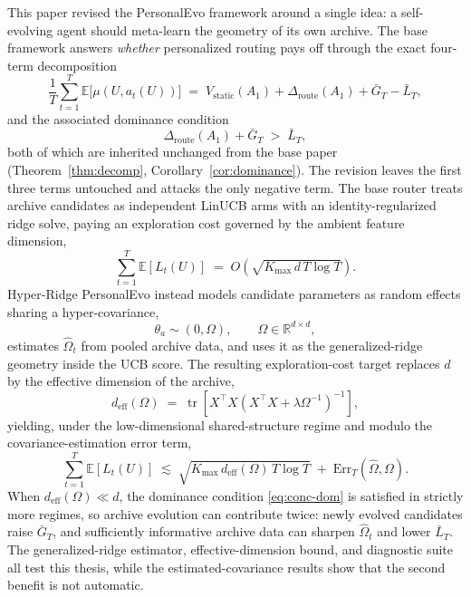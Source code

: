 \documentclass{article} %
\providecommand{\E}{\mathbb{E}}
\begin{document}
\label{sec:conclusion}

This paper revised the PersonalEvo framework around a single idea: a self-evolving agent should meta-learn the geometry of its own archive. The base framework answers \emph{whether} personalized routing pays off through the exact four-term decomposition
\begin{equation}
\label{eq:conc-decomp}
\frac{1}{T}\sum_{t=1}^{T}\E\bigl[\mu(U,a_t(U))\bigr]
\;=\;
V_{\mathrm{static}}(A_1)
+ \Delta_{\mathrm{route}}(A_1)
+ \bar G_T
- \bar L_T,
\end{equation}
and the associated dominance condition
\begin{equation}
\label{eq:conc-dom}
\Delta_{\mathrm{route}}(A_1) + \bar G_T \;>\; \bar L_T,
\end{equation}
both of which are inherited unchanged from the base paper (Theorem~\ref{thm:decomp}, Corollary~\ref{cor:dominance}). The revision leaves the first three terms untouched and attacks the only negative term. The base router treats archive candidates as independent LinUCB arms with an identity-regularized ridge solve, paying an exploration cost governed by the ambient feature dimension,
\begin{equation}
\label{eq:conc-base-rate}
\sum_{t=1}^{T}\E[L_t(U)]
\;=\;
O\!\left(\sqrt{K_{\max}\, d\, T \log T}\right).
\end{equation}
Hyper-Ridge PersonalEvo instead models candidate parameters as random effects sharing a hyper-covariance,
\begin{equation}
\label{eq:conc-random-effects}
\theta_a \sim (0,\Omega), \qquad \Omega \in \mathbb{R}^{d\times d},
\end{equation}
estimates $\widehat\Omega_t$ from pooled archive data, and uses it as the generalized-ridge geometry inside the UCB score. The resulting exploration-cost target replaces $d$ by the effective dimension of the archive,
\begin{equation}
\label{eq:conc-deff}
d_{\mathrm{eff}}(\Omega)
\;=\;
\operatorname{tr}\!\left[
X^\top X \left(X^\top X + \lambda \Omega^{-1}\right)^{-1}
\right],
\end{equation}
yielding, under the low-dimensional shared-structure regime and modulo the covariance-estimation error term,
\begin{equation}
\label{eq:conc-hyper-rate}
\sum_{t=1}^{T}\E[L_t(U)]
\;\lesssim\;
\sqrt{K_{\max}\, d_{\mathrm{eff}}(\Omega)\, T \log T}
\;+\;
\mathrm{Err}_T(\widehat\Omega, \Omega).
\end{equation}
When $d_{\mathrm{eff}}(\Omega) \ll d$, the dominance condition \eqref{eq:conc-dom} is satisfied in strictly more regimes, so archive evolution can contribute twice: newly evolved candidates raise $\bar G_T$, and sufficiently informative archive data can sharpen $\widehat\Omega_t$ and lower $\bar L_T$. The generalized-ridge estimator, effective-dimension bound, and diagnostic suite all test this thesis, while the estimated-covariance results show that the second benefit is not automatic.
\end{document}
